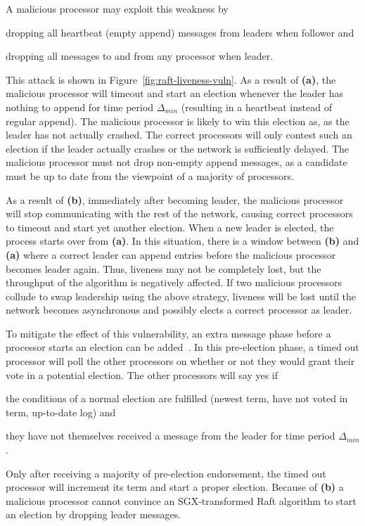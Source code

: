 \documentclass{article}
\begin{document}
	A malicious processor may exploit this weakness by
	\begin{enumerate*}[label=\textbf{(\alph*)}]
	  \item dropping all heartbeat (empty append) messages from leaders when follower and
	  \item dropping all messages to and from any processor when leader.
	\end{enumerate*}
	This attack is shown in Figure~\ref{fig:raft-liveness-vuln}.
	As a result of \textbf{(a)}, the malicious processor will timeout and start an election whenever the leader has nothing to append for time period $\Delta_{min}$ (resulting in a heartbeat instead of regular append).
	The malicious processor is likely to win this election as, as the leader has not actually crashed.
	The correct processors will only contest such an election if the leader actually crashes or the network is sufficiently delayed.
	The malicious processor must not drop non-empty append messages, as a candidate must be up to date from the viewpoint of a majority of processors.

	As a result of \textbf{(b)}, immediately after becoming leader, the malicious processor will stop communicating with the rest of the network, causing correct processors to timeout and start yet another election.
	When a new leader is elected, the process starts over from \textbf{(a)}.
	In this situation, there is a window between \textbf{(b)} and \textbf{(a)} where a correct leader can append entries before the malicious processor becomes leader again.
	Thus, liveness may not be completely lost, but the throughput of the algorithm is negatively affected.
	If two malicious processors collude to swap leadership using the above strategy, liveness will be lost until the network becomes asynchronous and possibly elects a correct processor as leader.

	To mitigate the effect of this vulnerability, an extra message phase before a processor starts an election can be added~\cite{ongaro_search_2014}.
	In this pre-election phase, a timed out processor will poll the other processors on whether or not they would grant their vote in a potential election.
	The other processors will say yes if
	\begin{enumerate*}[label=\textbf{(\alph*)}]
	  \item the conditions of a normal election are fulfilled (newest term, have not voted in term, up-to-date log) and
	  \item they have not themselves received a message from the leader for time period $\Delta_{min}$.
	\end{enumerate*}
	Only after receiving a majority of pre-election endorsement, the timed out processor will increment its term and start a proper election.
	Because of \textbf{(b)} a malicious processor cannot convince an SGX-transformed Raft algorithm to start an election by dropping leader messages.
\end{document}
